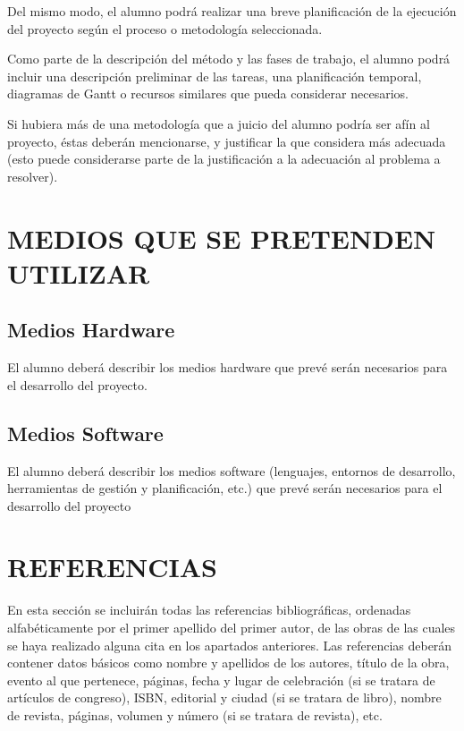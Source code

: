 \documentclass{pre-tfg}
\begin{document}
Del mismo modo, el alumno podrá realizar una breve planificación de la ejecución del
proyecto según el proceso o metodología seleccionada.

Como parte de la descripción del método y las fases de trabajo, el alumno podrá incluir
una descripción preliminar de las tareas, una planificación temporal, diagramas de Gantt o
recursos similares que pueda considerar necesarios.

Si hubiera más de una metodología que a juicio del alumno podría ser afín al proyecto,
éstas deberán mencionarse, y justificar la que considera más adecuada (esto puede
considerarse parte de la justificación a la adecuación al problema a resolver).


\section{MEDIOS QUE SE PRETENDEN UTILIZAR}

\subsection{Medios Hardware}

El alumno deberá describir los medios hardware que prevé serán necesarios para el
desarrollo del proyecto.


\subsection{Medios Software}

El alumno deberá describir los medios software (lenguajes, entornos de desarrollo,
herramientas de gestión y planificación, etc.) que prevé serán necesarios para el
desarrollo del proyecto


\section{REFERENCIAS}

En esta sección se incluirán todas las referencias bibliográficas, ordenadas
alfabéticamente por el primer apellido del primer autor, de las obras de las cuales se
haya realizado alguna cita en los apartados anteriores. Las referencias deberán contener
datos básicos como nombre y apellidos de los autores, título de la obra, evento al que
pertenece, páginas, fecha y lugar de celebración (si se tratara de artículos de congreso),
ISBN, editorial y ciudad (si se tratara de libro), nombre de revista, páginas, volumen y
número (si se tratara de revista), etc.
\end{document}
